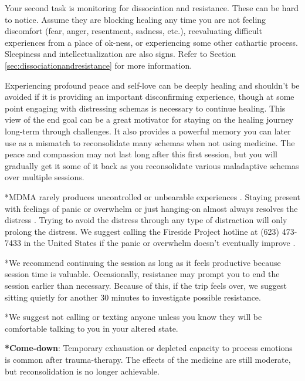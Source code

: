 \documentclass[12pt,letterpaper]{article}
\begin{document}
Your second task is monitoring for dissociation and resistance. These can be hard to notice. Assume they are blocking healing any time you are not feeling discomfort (fear, anger, resentment, sadness, etc.), reevaluating difficult experiences from a place of ok-ness, or experiencing some other cathartic process. Sleepiness and intellectualization are also signs. Refer to Section \ref{sec:dissociationandresistance} for more information. 

Experiencing profound peace and self-love can be deeply healing and shouldn't be avoided if it is providing an important disconfirming experience, though at some point engaging with distressing schemas is necessary to continue healing. This view of the end goal can be a great motivator for staying on the healing journey long-term through challenges. It also provides a powerful memory you can later use as a mismatch to reconsolidate many schemas when not using medicine. The peace and compassion may not last long after this first session, but you will gradually get it some of it back as you reconsolidate various maladaptive schemas over multiple sessions. 

*MDMA rarely produces uncontrolled or unbearable experiences \cite{mitchellMDMAClinicalTrial2,mitchellMDMAClinicalTrial}. Staying present with feelings of panic or overwhelm or just hanging-on almost always resolves the distress \cite{mithoeferManual}. Trying to avoid the distress through any type of distraction will only prolong the distress. We suggest calling the Fireside Project hotline at (623) 473-7433 in the United States if the panic or overwhelm doesn't eventually improve \cite{firesideProject}. 

*We recommend continuing the session as long as it feels productive because session time is valuable. Occasionally, resistance may prompt you to end the session earlier than necessary. Because of this, if the trip feels over, we suggest sitting quietly for another 30 minutes to investigate possible resistance.

*We suggest not calling or texting anyone unless you know they will be comfortable talking to you in your altered state.

\textbf{*Come-down}: 
Temporary exhaustion or depleted capacity to process emotions is common after trauma-therapy. The effects of the medicine are still moderate, but reconsolidation is no longer achievable.
\end{document}
